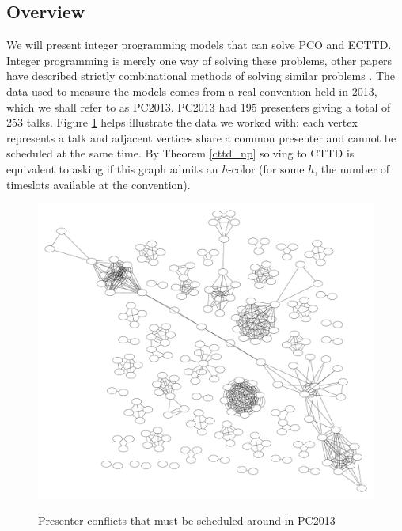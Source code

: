 \documentclass[]{article}
\theoremstyle{definition}
\theoremstyle{remark}
\numberwithin{equation}{section}
\begin{document}
\subsection{Overview}
We will present integer programming models that can solve PCO and ECTTD. Integer programming is merely one way of solving these problems, other papers have described strictly combinational methods of solving similar problems \cite{cheng}. The data used to measure the models comes from a real convention held in 2013, which we shall refer to as PC2013. PC2013 had 195 presenters giving a total of 253 talks. Figure \ref{fig_pc2013_graph} helps illustrate the data we worked with: each vertex represents a talk and adjacent vertices share a common presenter and cannot be scheduled at the same time. By Theorem \ref{cttd_np} solving to CTTD is equivalent to asking if this graph admits an $h$-color (for some $h$, the number of timeslots available at the convention).
\begin{figure}[h!]
	\caption{Presenter conflicts that must be scheduled around in PC2013}
	\centering
		\includegraphics[scale=0.2]{penguiconconflict}
	\label{fig_pc2013_graph}
\end{figure}
\end{document}

